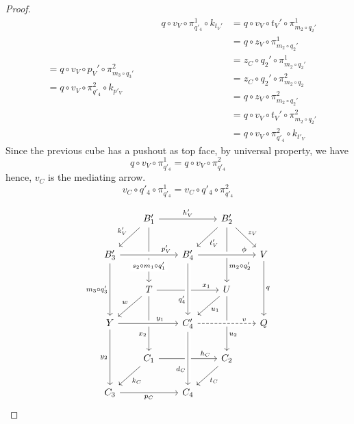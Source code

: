 \documentclass[a4paper,UKenglish,cleveref,pdftex,thm-restate,numberwithinsect]{lipics-v2021}
\begin{document}
\begin{proof}
\[\begin{split}
		&= q \circ v_V \circ p_V' \circ \pi_{m_3 \circ q_3'}^2 \\
		&= q \circ v_V \circ \pi_{q'_4}^2 \circ k_{p'_V}
	\end{split}\qquad\begin{split}
		q \circ v_V \circ \pi_{q'_4}^1 \circ k_{t_V'} &= q \circ v_V \circ t_V' \circ \pi_{m_2 \circ q_2'}^1 \\
		&= q \circ z_V \circ \pi_{m_2 \circ q_2'}^1 \\
		&= z_C \circ q_2' \circ \pi_{m_2 \circ q_2'}^1 \\
		&= z_C \circ q_2' \circ \pi_{m_2 \circ q_2}^2 \\
		&= q \circ z_V \circ \pi_{m_2 \circ q_2'}^2 \\
		&= q \circ v_V \circ t_V' \circ \pi_{m_2 \circ q_2'}^2 \\
		&= q \circ v_V \circ \pi_{q'_4}^2 \circ k_{t'_V}
	\end{split}\]
	Since the previous cube has a pushout as top face, by universal property, we have
	\[
	q \circ v_V \circ \pi_{q'_4}^1 = q \circ v_V \circ \pi_{q'_4}^2
	\]
	hence, $v_C$ is the mediating arrow.
	\[
	v_C \circ q'_4 \circ \pi_{q'_4}^1 = v_C \circ q'_4 \circ \pi_{q'_4}^2
	\]
	
	

	\[\begin{tikzcd}[row sep = 20, column sep = 20]
		& {B_1'} && {B_2'} \\
		{B_3'} && {B_4'} && V \\
		& T && U \\
		Y && {C_4'} && Q \\
		& {C_1} && {C_2} \\
		{C_3} && {C_4}
		\arrow["{h_V'}", from=1-2, to=1-4]
		\arrow["{k_V'}"', from=1-2, to=2-1]
		\arrow["{s_2\circ m_1 \circ q_1'}"{description, pos=0.7}, from=1-2, to=3-2]
		\arrow["{t_V'}", from=1-4, to=2-3]
		\arrow["{z_V}", from=1-4, to=2-5]
		\arrow["{m_2\circ q'_2}"{pos=0.7}, from=1-4, to=3-4]
		\arrow["{m_3 \circ q'_3}"', from=2-1, to=4-1]
		\arrow["q", from=2-5, to=4-5]
		\arrow["{x_1}"{pos=0.8}, from=3-2, to=3-4]
		\arrow["w"', from=3-2, to=4-1]
		\arrow["{x_2}"'{pos=0.7}, from=3-2, to=5-2]
		\arrow["{u_1}", from=3-4, to=4-3]
		\arrow["{u_2}"{pos=0.7}, from=3-4, to=5-4]
		\arrow["{y_2}"', from=4-1, to=6-1]
		\arrow["{h_C}"{pos=0.8}, from=5-2, to=5-4]
		\arrow["{k_C}", from=5-2, to=6-1]
		\arrow["{t_C}", from=5-4, to=6-3]
		\arrow["{p_C}"', from=6-1, to=6-3]
		\arrow["{p_V'}"{pos=0.8}, from=2-1, to=2-3, crossing over]
		\arrow["\phi"{pos=0.8}, from=2-3, to=2-5, crossing over]
		\arrow["{q'_4}"'{pos=0.7}, from=2-3, to=4-3, crossing over]
		\arrow["{y_1}"{pos=0.7}, from=4-1, to=4-3, crossing over]
		\arrow["{d_C}"'{pos=0.7}, from=4-3, to=6-3, crossing over]
		\arrow["v"{pos=0.8}, dashed, from=4-3, to=4-5, crossing over]
	\end{tikzcd}\]
	

\end{proof}
\end{document}
